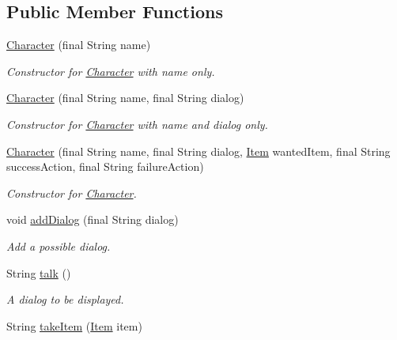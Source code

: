 \subsection*{Public Member Functions}
\begin{DoxyCompactItemize}
\item 
\hyperlink{classpkg__world_1_1pkg__characters_1_1Character_a50bcfb95d983b94d0335bd457d575872}{Character} (final String name)
\begin{DoxyCompactList}\small\item\em Constructor for \hyperlink{classpkg__world_1_1pkg__characters_1_1Character}{Character} with name only. \end{DoxyCompactList}\item 
\hyperlink{classpkg__world_1_1pkg__characters_1_1Character_a1dcca115f6536e7d4d99ab3880291376}{Character} (final String name, final String dialog)
\begin{DoxyCompactList}\small\item\em Constructor for \hyperlink{classpkg__world_1_1pkg__characters_1_1Character}{Character} with name and dialog only. \end{DoxyCompactList}\item 
\hyperlink{classpkg__world_1_1pkg__characters_1_1Character_a3944beae4c725dac40c288715af8061c}{Character} (final String name, final String dialog, \hyperlink{classpkg__world_1_1pkg__items_1_1Item}{Item} wanted\-Item, final String success\-Action, final String failure\-Action)
\begin{DoxyCompactList}\small\item\em Constructor for \hyperlink{classpkg__world_1_1pkg__characters_1_1Character}{Character}. \end{DoxyCompactList}\item 
void \hyperlink{classpkg__world_1_1pkg__characters_1_1Character_a926da3833d26f4800fcd62917be5abcc}{add\-Dialog} (final String dialog)
\begin{DoxyCompactList}\small\item\em Add a possible dialog. \end{DoxyCompactList}\item 
String \hyperlink{classpkg__world_1_1pkg__characters_1_1Character_a8b6d62bb87460e19dc0e4561beb1ece1}{talk} ()
\begin{DoxyCompactList}\small\item\em A dialog to be displayed. \end{DoxyCompactList}\item 
String \hyperlink{classpkg__world_1_1pkg__characters_1_1Character_a0fb83fcff9b37c94eac3fb35868bebb2}{take\-Item} (\hyperlink{classpkg__world_1_1pkg__items_1_1Item}{Item} item)

\end{DoxyCompactItemize}
